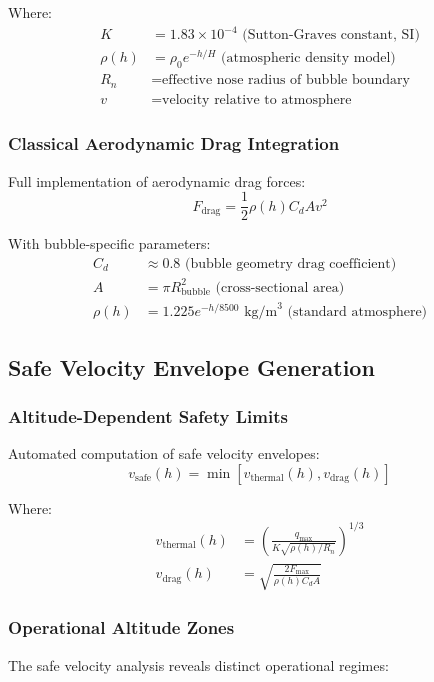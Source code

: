\documentclass[11pt]{article}
\begin{document}
Where:
\begin{align}
K &= 1.83 \times 10^{-4} \text{ (Sutton-Graves constant, SI)} \\
\rho(h) &= \rho_0 e^{-h/H} \text{ (atmospheric density model)} \\
R_n &= \text{effective nose radius of bubble boundary} \\
v &= \text{velocity relative to atmosphere}
\end{align}

\subsubsection{Classical Aerodynamic Drag Integration}
Full implementation of aerodynamic drag forces:
\begin{equation}
F_{\text{drag}} = \frac{1}{2} \rho(h) C_d A v^2
\end{equation}

With bubble-specific parameters:
\begin{align}
C_d &\approx 0.8 \text{ (bubble geometry drag coefficient)} \\
A &= \pi R_{\text{bubble}}^2 \text{ (cross-sectional area)} \\
\rho(h) &= 1.225 e^{-h/8500} \text{ kg/m}^3 \text{ (standard atmosphere)}
\end{align}

\subsection{Safe Velocity Envelope Generation}

\subsubsection{Altitude-Dependent Safety Limits}
Automated computation of safe velocity envelopes:
\begin{equation}
v_{\text{safe}}(h) = \min[v_{\text{thermal}}(h), v_{\text{drag}}(h)]
\end{equation}

Where:
\begin{align}
v_{\text{thermal}}(h) &= \left(\frac{q_{\text{max}}}{K \sqrt{\rho(h)/R_n}}\right)^{1/3} \\
v_{\text{drag}}(h) &= \sqrt{\frac{2 F_{\text{max}}}{\rho(h) C_d A}}
\end{align}

\subsubsection{Operational Altitude Zones}
The safe velocity analysis reveals distinct operational regimes:
\end{document}
